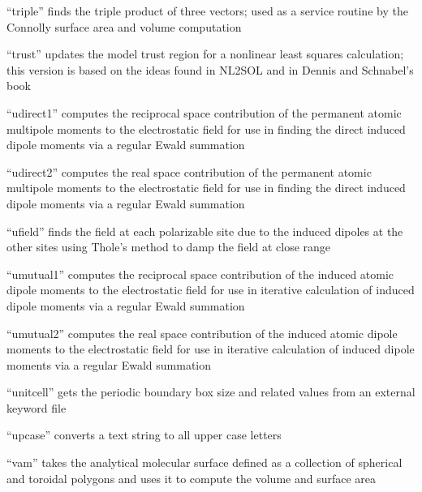 \documentclass[letterpaper,11pt,english]{sphinxmanual}
\begin{document}

“triple” finds the triple product of three vectors; used as a service routine by the Connolly surface area and volume computation


“trust” updates the model trust region for a nonlinear least squares calculation; this version is based on the ideas found in NL2SOL and in Dennis and Schnabel’s book


“udirect1” computes the reciprocal space contribution of the permanent atomic multipole moments to the electrostatic field for use in finding the direct induced dipole moments via a regular Ewald summation


“udirect2” computes the real space contribution of the permanent atomic multipole moments to the electrostatic field for use in finding the direct induced dipole moments via a regular Ewald summation


“ufield” finds the field at each polarizable site due to the induced dipoles at the other sites using Thole’s method to damp the field at close range


“umutual1” computes the reciprocal space contribution of the induced atomic dipole moments to the electrostatic field for use in iterative calculation of induced dipole moments via a regular Ewald summation


“umutual2” computes the real space contribution of the induced atomic dipole moments to the electrostatic field for use in iterative calculation of induced dipole moments via a regular Ewald summation


“unitcell” gets the periodic boundary box size and related values from an external keyword file


“upcase” converts a text string to all upper case letters


“vam” takes the analytical molecular surface defined as a collection of spherical and toroidal polygons and uses it to compute the volume and surface area
\end{document}

